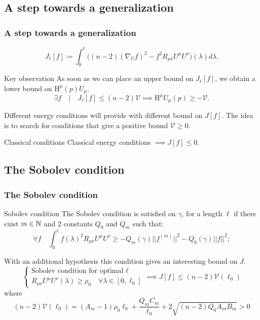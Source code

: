 \documentclass[handout]{beamer}
\begin{document}
	\subsection{A step towards a generalization}
	\begin{frame}
		\frametitle{A step towards a generalization}
		\[
		J_{\ell}[f] \coloneqq \int_{0}^{\ell} \big((n -2)(\nabla_Uf)^2 - f^2R_{\mu\nu}U^{\mu}U^{\nu} \big)(\lambda) d\lambda.
		\]
		\begin{ideablock}{Key observation}
			As soon as we can place an upper bound on \(J_{\ell}[f]\), we obtain a lower bound on \(\mathrm{H}^{\mu}(p)U_{\mu}\).
			\[
				\exists f \quad\vert\quad  J_{\ell}[f] \le (n - 2)\mathcal{V} \implies \mathrm{H}^{\mu}U_{\mu}(p) \ge -\mathcal{V}.
			\]
		\end{ideablock}
		Different energy conditions will provide with different bound on \(J[f]\). The idea is to search for conditions that give a positive bound \(\mathcal{V} \ge 0\).
		\begin{defblock}{Classical conditions}
			Classical energy conditions \(\implies J[f] \le 0\). 
		\end{defblock}

	\end{frame}

	\subsection{The Sobolev condition}
	\begin{frame}
		\frametitle{The Sobolev condition}
		\begin{defblock}{Sobolev condition}
		The Sobolev condition is satisfied on \(\gamma\), for a length \(\ell\) if there exist \(m\in{\mathbb{N}}\) and \(2\) constants \(Q_0\) and \(Q_m\) such that:
		\[
		\forall f \quad
		\int_0^{\ell} f(\lambda)^2 R_{\mu\nu}U^{\mu}U^{\nu} \ge -Q_m(\gamma) \vert\vert f^{(m)}\vert\vert^2 - Q_0(\gamma) \vert\vert f\vert\vert^2;
		\]
		\end{defblock}
		With an additional hypothesis this condition gives an interesting bound on \(J\).
		\[
		\begin{cases}
			\text{Sobolev condition for optimal }\ell \\
			R_{\mu\nu}U^{\mu}U^{\nu}(\lambda) \ge \rho_0 \quad \forall\lambda\in[0,\ell_0]
		\end{cases}	
		\implies
		J[f] \le (n - 2)\mathcal{V}(\ell_0)
		\]
		where
		\[
			(n - 2)\mathcal{V}(\ell_0) = (A_m - 1)\rho_0\ell_0 + \frac{Q_mC_m}{\ell_0} + 2\sqrt{(n - 2)Q_0A_mB_m} > 0
		\]
	\end{frame}
\end{document}
